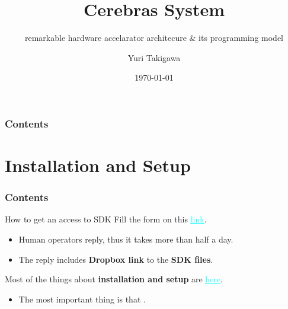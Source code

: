 \documentclass[dvipdfmx, 11pt, aspectratio=169]{beamer}   %
\title{Cerebras System}
\subtitle{remarkable hardware accelarator architecure \& its programming model}
\author{Yuri Takigawa}
\institute{The university of Tokyo, EEIC, Taura Lab}
\date{\today}
\newcommand{\ulhref}[2]{\href{#1}{\textcolor{cyan}{\uline{#2}}}}
\begin{document}
\begin{frame}
  \titlepage       
\end{frame}
\begin{frame}
  \frametitle{Contents}
  \tableofcontents[]
\end{frame}
\section{Installation and Setup}
\begin{frame}
    \frametitle{Contents}
    \tableofcontents[currentsection]
\end{frame}
\begin{frame}{How to get an access to SDK}
Fill the form on this \ulhref{https://www.cerebras.ai/developers/sdk-request}{link}.
\begin{itemize}
    \item Human operators reply, thus it takes more than half a day.
    \item The reply includes \textbf{Dropbox link} to the \textbf{SDK files}.
\end{itemize}
Most of the things about \textbf{installation and setup} are \ulhref{https://sdk.cerebras.net/installation-guide}{here}.
\begin{itemize}
    \item The most important thing is that .
\end{itemize}
\end{frame}
\end{document}
